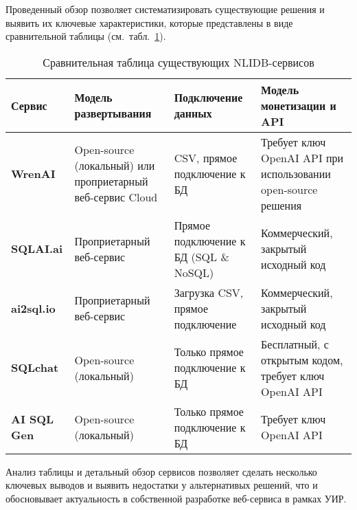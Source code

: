 Проведенный обзор позволяет систематизировать существующие решения и выявить их
ключевые характеристики, которые представлены в виде сравнительной таблицы
(см.~табл.~\ref{table:services_comparison}).

\begin{table}[ht]
	\caption{Сравнительная таблица существующих NLIDB-сервисов}\label{table:services_comparison}
	\begin{tabularx}{\linewidth}{|>{\bfseries}l|X|X|X|}
		\hline
		\textbf{Сервис} & \textbf{Модель развертывания}                              & \textbf{Подключение данных}                & \textbf{Модель монетизации и API}                             \\
		\hline
		WrenAI          & Open-source (локальный) или проприетарный веб-сервис Cloud & CSV, прямое подключение к БД               & Требует ключ OpenAI API при использовании open-source решения \\
		\hline
		SQLAI.ai        & Проприетарный веб-сервис                                   & Прямое подключение к БД (SQL     \& NoSQL) & Коммерческий, закрытый исходный код                           \\
		\hline
		ai2sql.io       & Проприетарный веб-сервис                                   & Загрузка CSV, прямое подключение           & Коммерческий, закрытый исходный код                           \\
		\hline
		SQLchat         & Open-source (локальный)                                    & Только прямое подключение к БД             & Бесплатный, с открытым кодом, требует ключ OpenAI API         \\
		\hline
		AI SQL Gen      & Open-source (локальный)                                    & Только прямое подключение к БД             & Требует ключ OpenAI API                                       \\
		\hline
	\end{tabularx}
\end{table}

Анализ таблицы и детальный обзор сервисов позволяет сделать несколько ключевых выводов
и выявить недостатки у альтернативых решений, что и обосновывает актуальность в собственной разработке
веб-сервиса в рамках УИР.

